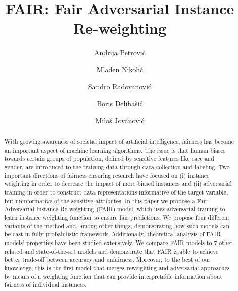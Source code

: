 \documentclass[preprint,12pt]{elsarticle}
\begin{document}
\begin{frontmatter}



\title{FAIR: Fair Adversarial Instance Re-weighting}
\tnotetext[label1]{}


\author[FON]{Andrija Petrović}
\author[MATF]{Mladen Nikolić}
\author[FON]{Sandro Radovanović}
\author[FON]{Boris Delibašić}
\author[FON]{Miloš Jovanović}

\address[FON]{University of Belgrade - Faculty of Organizational Sciences, Jove Ilica 154, Belgrade, Serbia}
\address[MATF]{University of Belgrade - Faculty of Mathematics, Studentski Trg 16, Belgrade, Serbia}



\begin{abstract}
With growing awareness of societal impact of artificial intelligence, fairness has become an important aspect of machine learning algorithms. The issue is that human biases towards certain groups of population, defined by sensitive features like race and gender, are introduced to the training data through data collection and labeling. Two important directions of fairness ensuring research have focused on (i) instance weighting in order to decrease the impact of more biased instances and (ii) adversarial training in order to construct data representations informative of the target variable, but uninformative of the sensitive attributes. In this paper we propose a Fair Adversarial Instance Re-weighting (FAIR) model, which uses adversarial training to learn instance weighting function to ensure fair predictions. We propose four different variants of the method and, among other things, demonstrating how such models can be cast in fully probabilistic framework. Additionally, theoretical analysis of FAIR models' properties have been studied extensively. We compare FAIR models to 7 other related and state-of-the-art models and demonstrate that FAIR is able to achieve better trade-off between accuracy and unfairness. Moreover, to the best of our knowledge, this is the first model that merges reweighting and adversarial approaches by means of a weighting function that can provide interpretable information about fairness of individual instances.
\end{abstract}



\end{frontmatter}
\end{document}
